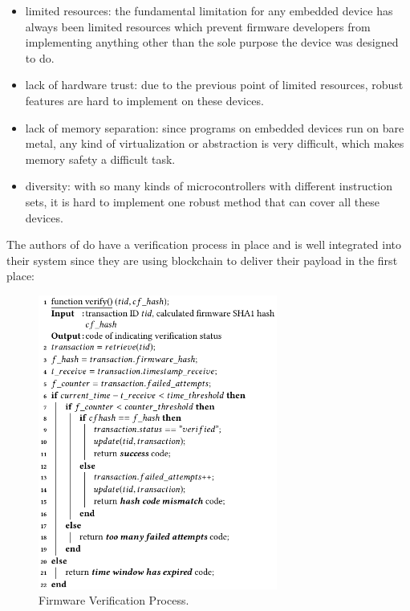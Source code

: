 \documentclass{article}
\begin{document}
\begin{itemize}
    \item limited resources: the fundamental limitation for any embedded device has always been limited resources which prevent firmware developers from implementing anything other than the sole purpose the device was designed to do.
    \item lack of hardware trust: due to the previous point of limited resources, robust features are hard to implement on these devices.
    \item lack of memory separation: since programs on embedded devices run on bare metal, any kind of virtualization or abstraction is very difficult, which makes memory safety a difficult task.
    \item diversity: with so many kinds of microcontrollers with different instruction sets, it is hard to implement one robust method that can cover all these devices.
\end{itemize}

The authors of \cite{otaupdate} do have a verification process in place and is well integrated into their system since they are using blockchain to deliver their payload in the first place:
\begin{figure}[H]
    \centering
    \includegraphics[width=0.7\textwidth]{ota04.png}
    \caption{Firmware Verification Process.\cite{otaupdate}}
\end{figure}
\end{document}
